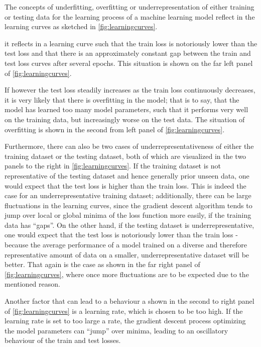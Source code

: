 \documentclass[a4paper,12pt]{report}
\def\lk#1{{\color{black}{#1}}}
\begin{document}
The concepts of underfitting, overfitting or underrepresentation of either training or testing data for the learning process of a machine learning model reflect in the learning curves as sketched in \cref{fig:learningcurves}. 

\lk{As underfitting means that the model has not learned enough parameters to generalize to unseen data,} it reflects in a learning curve such that the train loss is notoriously lower than the test loss and that there is an approximately constant gap between the train and test loss curves after several epochs. This situation is shown on the far left panel of \cref{fig:learningcurves}. 

If however the test loss steadily increases as the train loss continuously decreases, it is very likely that there is overfitting in the model; that is to say, that the model has learned too many model parameters, such that it performs very well on the training data, but increasingly worse on the test data. The situation of overfitting is shown in the second from left panel of \cref{fig:learningcurves}. 

Furthermore, there can also be two cases of underrepresentativeness of either the training dataset or the testing dataset, both of which are visualized in the two panels to the right in \cref{fig:learningcurves}. If the training dataset is not representative of the testing dataset and hence generally \lk{of} prior unseen data, one would expect that the test loss is higher than the train loss. This is indeed the case for an underrepresentative training dataset; additionally, there can be large fluctuations in the learning curves, since the gradient descent algorithm tends to jump over local or global minima of the loss function more easily, if the training data has ``gaps''. On the other hand, if the testing dataset is underrepresentative, one would expect that the test loss is notoriously lower than the train loss - because the average performance of a model trained on a diverse and therefore representative amount of data on a smaller, underrepresentative dataset will be better. That again is the case as shown in the far right panel of \cref{fig:learningcurves}, where once more fluctuations are to be expected due to the mentioned reason. 

Another factor that can lead to a behaviour a shown in the second to right panel of \cref{fig:learningcurves} is a learning rate, which is chosen to be too high. If the learning rate is set to too large a rate, the gradient descent process optimizing the model parameters can ``jump'' over minima, leading to an oscillatory behaviour of the train and test losses.
\end{document}
